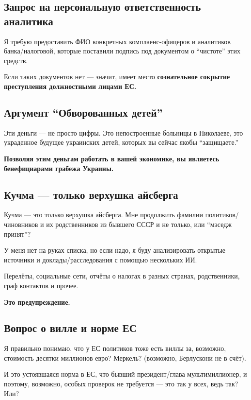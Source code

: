 \documentclass[11pt,a4paper]{article}
\theoremstyle{definition}
\theoremstyle{remark}
\begin{document}
{\subsection{Запрос на персональную ответственность аналитика}

Я требую предоставить ФИО конкретных комплаенс-офицеров и аналитиков банка/налоговой, 
которые поставили подпись под документом о ``чистоте'' этих средств.

Если таких документов нет — значит, имеет место \textbf{сознательное сокрытие 
преступления должностными лицами ЕС.}

\subsection{Аргумент ``Обворованных детей''}

Эти деньги — не просто цифры. Это непостроенные больницы в Николаеве, это украденное 
будущее украинских детей, которых вы сейчас якобы ``защищаете.''

\textbf{Позволяя этим деньгам работать в вашей экономике, вы являетесь бенефициарами 
грабежа Украины.}

\subsection{Кучма — только верхушка айсберга}

Кучма — это только верхушка айсберга. Мне продолжить фамилии политиков/чиновников 
и их родственников из бывшего СССР и не только, или ``мэседж принят''?

У меня нет на руках списка, но если надо, я буду анализировать открытые источники 
и доклады/расследования с помощью нескольких ИИ.

Перелёты, социальные сети, отчёты о налогах в разных странах, родственники, граф 
контактов и прочее.

\textbf{Это предупреждение.}

\subsection{Вопрос о вилле и норме ЕС}

Я правильно понимаю, что у ЕС политиков тоже есть виллы за, возможно, стоимость 
десятки миллионов евро? Меркель? (возможно, Берлускони не в счёт).

И это устоявшаяся норма в ЕС, что бывший президент/глава мультимиллионер, и поэтому, 
возможно, особых проверок не требуется — это так у всех, ведь так? Или?

} %
\end{document}
